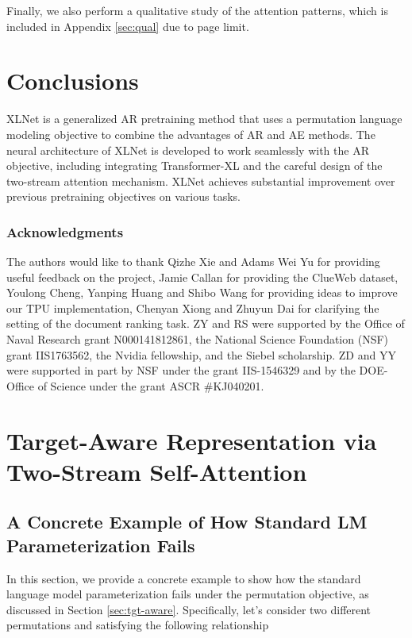 \documentclass{article}
\begin{document}
Finally, we also perform a qualitative study of the attention patterns, which is included in Appendix \ref{sec:qual} due to page limit.


 
\section{Conclusions}
XLNet is a generalized AR pretraining method that uses a permutation language modeling objective to combine the advantages of AR and AE methods. The neural architecture of XLNet is developed to work seamlessly with the AR objective, including integrating Transformer-XL and the careful design of the two-stream attention mechanism. 
XLNet achieves substantial improvement over previous pretraining objectives on various tasks.
 

\subsubsection*{Acknowledgments}
The authors would like to thank Qizhe Xie and Adams Wei Yu for providing useful feedback on the project, Jamie Callan for providing the ClueWeb dataset, Youlong Cheng, Yanping Huang and Shibo Wang for providing ideas to improve our TPU implementation, Chenyan Xiong and Zhuyun Dai for clarifying the setting of the document ranking task.
ZY and RS were supported by the Office of Naval Research grant N000141812861, the National Science Foundation (NSF) grant IIS1763562, the Nvidia fellowship, and the Siebel scholarship.
ZD and YY were supported in part by NSF under the grant IIS-1546329 and by the DOE-Office of Science under the grant ASCR \#KJ040201.





\newpage
\appendix

\section{Target-Aware Representation via Two-Stream Self-Attention}

\subsection{A Concrete Example of How Standard LM Parameterization Fails}
\label{sec:tgt-aware-example}


In this section, we provide a concrete example to show how the standard language model parameterization fails under the permutation objective, as discussed in Section \ref{sec:tgt-aware}.
Specifically, let's consider two different permutations  and  satisfying the following relationship
\end{document}
